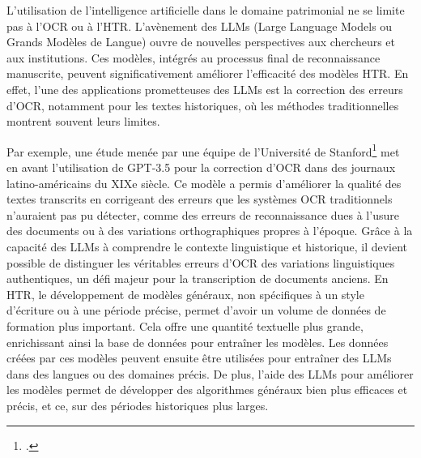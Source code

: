 \documentclass[a4paper,12pt,twoside]{book}
\begin{document}
	L'utilisation de l'intelligence artificielle dans le domaine patrimonial ne se limite pas à l'OCR ou à l'HTR. L'avènement des LLMs (Large Language Models ou Grands Modèles de Langue) ouvre de nouvelles perspectives aux chercheurs et aux institutions. Ces modèles, intégrés au processus final de reconnaissance manuscrite, peuvent significativement améliorer l'efficacité des modèles HTR. En effet, l’une des applications prometteuses des LLMs est la correction des erreurs d’OCR, notamment pour les textes historiques, où les méthodes traditionnelles montrent souvent leurs limites.
	
	Par exemple, une étude menée par une équipe de l’Université de Stanford\footcite{manrique-gomez_historical_2024} met en avant l’utilisation de GPT-3.5 pour la correction d’OCR dans des journaux latino-américains du XIXe siècle. Ce modèle a permis d’améliorer la qualité des textes transcrits en corrigeant des erreurs que les systèmes OCR traditionnels n’auraient pas pu détecter, comme des erreurs de reconnaissance dues à l’usure des documents ou à des variations orthographiques propres à l’époque. Grâce à la capacité des LLMs à comprendre le contexte linguistique et historique, il devient possible de distinguer les véritables erreurs d’OCR des variations linguistiques authentiques, un défi majeur pour la transcription de documents anciens.
	En HTR, le développement de modèles généraux, non spécifiques à un style d’écriture ou à une période précise, permet d’avoir un volume de données de formation plus important. Cela offre une quantité textuelle plus grande, enrichissant ainsi la base de données pour entraîner les modèles. Les données créées par ces modèles peuvent ensuite être utilisées pour entraîner des LLMs dans des langues ou des domaines précis. De plus, l'aide des LLMs pour améliorer les modèles permet de développer des algorithmes généraux bien plus efficaces et précis, et ce, sur des périodes historiques plus larges.
	
\end{document}
